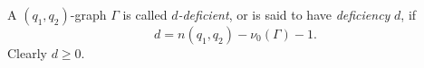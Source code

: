 A $(q_1, q_2)$-graph $\Gamma$ is called \emph{$d$-deficient}, or is said to have \emph{deficiency} $d$, if
$$d = n(q_1, q_2) - \nu_0(\Gamma) - 1.$$
Clearly $d \geq 0$.
